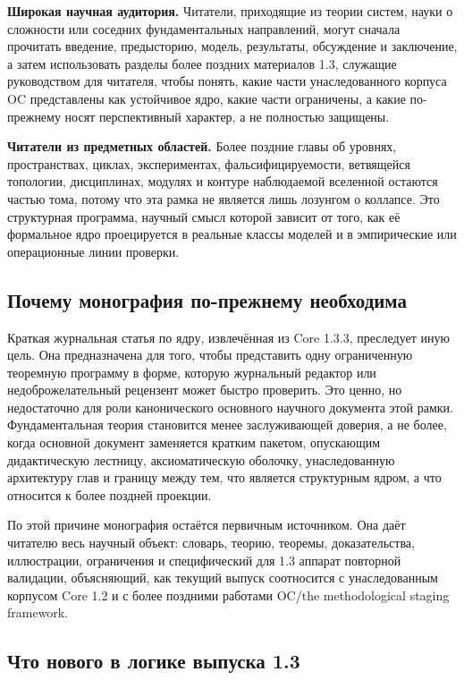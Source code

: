 \textbf{Широкая научная аудитория.}
Читатели, приходящие из теории систем, науки о сложности или соседних фундаментальных направлений, могут сначала прочитать введение, предысторию, модель, результаты, обсуждение и заключение, а затем использовать разделы более поздних материалов 1.3, служащие руководством для читателя, чтобы понять, какие части унаследованного корпуса OC представлены как устойчивое ядро, какие части ограничены, а какие по-прежнему носят перспективный характер, а не полностью защищены.

\textbf{Читатели из предметных областей.}
Более поздние главы об уровнях, пространствах, циклах, экспериментах, фальсифицируемости, ветвящейся топологии, дисциплинах, модулях и контуре наблюдаемой вселенной остаются частью тома, потому что эта рамка не является лишь лозунгом о коллапсе. Это структурная программа, научный смысл которой зависит от того, как её формальное ядро проецируется в реальные классы моделей и в эмпирические или операционные линии проверки.

\subsection{Почему монография по-прежнему необходима}

Краткая журнальная статья по ядру, извлечённая из Core 1.3.3, преследует иную цель.
Она предназначена для того, чтобы представить одну ограниченную теоремную программу в форме, которую журнальный редактор или недоброжелательный рецензент может быстро проверить. Это ценно, но недостаточно для роли канонического основного научного документа этой рамки. Фундаментальная теория становится менее заслуживающей доверия, а не более, когда основной документ заменяется кратким пакетом, опускающим дидактическую лестницу, аксиоматическую оболочку, унаследованную архитектуру глав и границу между тем, что является структурным ядром, а что относится к более поздней проекции.

По этой причине монография остаётся первичным источником. Она даёт читателю весь научный объект: словарь, теорию, теоремы, доказательства, иллюстрации, ограничения и специфический для 1.3 аппарат повторной валидации, объясняющий, как текущий выпуск соотносится с унаследованным корпусом Core 1.2 и с более поздними работами OC/the methodological staging framework.

\subsection{Что нового в логике выпуска 1.3}

